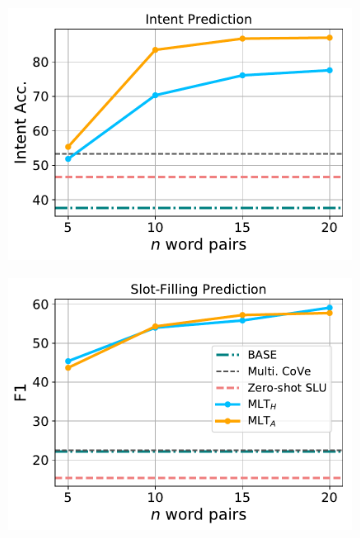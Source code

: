 \documentclass[letterpaper]{article}
\begin{document}
\begin{figure}[!ht]
\centering
\begin{subfigure}{.24\textwidth}
    \centering
    \includegraphics[scale=0.32]{es_intent.pdf}
    \caption{}
    \label{fig:intent-es}
\end{subfigure}
\begin{subfigure}{.24\textwidth}
    \centering
    \includegraphics[scale=0.32]{es_slot.pdf}
    \caption{}
    \label{fig:slot-es}
\end{subfigure}
\begin{subfigure}{.24\textwidth}
    \centering

\end{subfigure}
\end{figure}
\end{document}
